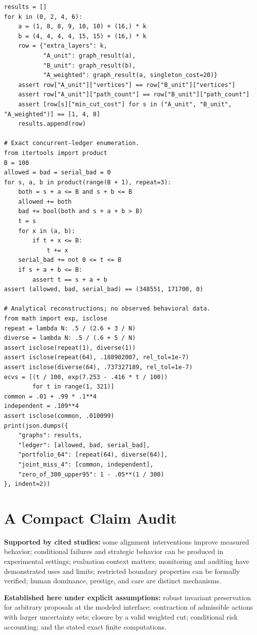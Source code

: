 \documentclass[10pt,twocolumn,letterpaper]{article}
\begin{document}
\begin{lstlisting}
results = []
for k in (0, 2, 4, 6):
    a = (1, 8, 8, 9, 10, 10) + (16,) * k
    b = (4, 4, 4, 4, 15, 15) + (16,) * k
    row = {"extra_layers": k,
           "A_unit": graph_result(a),
           "B_unit": graph_result(b),
           "A_weighted": graph_result(a, singleton_cost=20)}
    assert row["A_unit"]["vertices"] == row["B_unit"]["vertices"]
    assert row["A_unit"]["path_count"] == row["B_unit"]["path_count"]
    assert [row[s]["min_cut_cost"] for s in ("A_unit", "B_unit", "A_weighted")] == [1, 4, 8]
    results.append(row)

# Exact concurrent-ledger enumeration.
from itertools import product
B = 100
allowed = bad = serial_bad = 0
for s, a, b in product(range(B + 1), repeat=3):
    both = s + a <= B and s + b <= B
    allowed += both
    bad += bool(both and s + a + b > B)
    t = s
    for x in (a, b):
        if t + x <= B:
            t += x
    serial_bad += not 0 <= t <= B
    if s + a + b <= B:
        assert t == s + a + b
assert (allowed, bad, serial_bad) == (348551, 171700, 0)

# Analytical reconstructions; no observed behavioral data.
from math import exp, isclose
repeat = lambda N: .5 / (2.6 + 3 / N)
diverse = lambda N: .5 / (.6 + 5 / N)
assert isclose(repeat(1), diverse(1))
assert isclose(repeat(64), .188902007, rel_tol=1e-7)
assert isclose(diverse(64), .737327189, rel_tol=1e-7)
ecvs = [(t / 100, exp(7.253 - .416 * t / 100))
        for t in range(1, 321)]
common = .01 + .99 * .1**4
independent = .109**4
assert isclose(common, .010099)
print(json.dumps({
    "graphs": results,
    "ledger": [allowed, bad, serial_bad],
    "portfolio_64": [repeat(64), diverse(64)],
    "joint_miss_4": [common, independent],
    "zero_of_300_upper95": 1 - .05**(1 / 300)
}, indent=2))
\end{lstlisting}

\section{A Compact Claim Audit}
\textbf{Supported by cited studies:} some alignment interventions improve measured behavior; conditional failures and strategic behavior can be produced in experimental settings; evaluation context matters; monitoring and auditing have demonstrated uses and limits; restricted boundary properties can be formally verified; human dominance, prestige, and care are distinct mechanisms.

\textbf{Established here under explicit assumptions:} robust invariant preservation for arbitrary proposals at the modeled interface; contraction of admissible actions with larger uncertainty sets; closure by a valid weighted cut; conditional risk accounting; and the stated exact finite computations.
\end{document}
